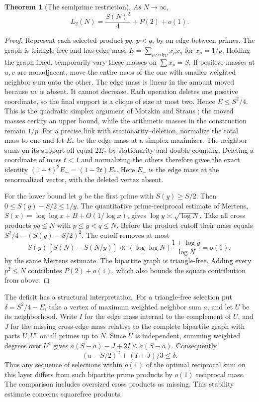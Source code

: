 \documentclass[11pt,a4paper]{article}
\newtheorem{theorem}{Theorem}[section]
\begin{document}
\begin{theorem}[The semiprime restriction]\label{thm:lcm-semiprimes}
As $N\to\infty$,
\[
 L_2(N)=\frac{S(N)^2}{4}+P(2)+o(1).
\]
\end{theorem}
\begin{proof}
Represent each selected product $pq$, $p<q$, by an edge between primes.
The graph is triangle-free and has edge mass
$E=\sum_{pq\text{ edge}}x_px_q$ for $x_p=1/p$. Holding the graph
fixed, temporarily vary these masses on $\sum x_p=S$. If positive masses
at $u,v$ are nonadjacent, move the entire mass of the one with smaller
weighted neighbor sum onto the other. The edge mass is linear in the
amount moved because $uv$ is absent. It cannot decrease. Each operation
deletes one positive coordinate, so the final support is a clique of size
at most two. Hence $E\le S^2/4$. This is the quadratic simplex argument
of Motzkin and Straus \cite{motzkin-lcm}; the moved masses certify an
upper bound, while the arithmetic masses in the construction remain $1/p$.
For a precise link with stationarity--deletion, normalize the total mass to
one and let $E_*$ be the edge mass at a simplex maximizer. The neighbor
sums on its support all equal $2E_*$ by stationarity and double counting.
Deleting a coordinate of mass $t<1$ and normalizing the others therefore
gives the exact identity $(1-t)^2E_{-}=(1-2t)E_*$. Here $E_{-}$ is
the edge mass at the renormalized vector, with the deleted vertex absent.

For the lower bound let $y$ be the first prime with $S(y)\ge S/2$.
Then $0\le S(y)-S/2\le1/y$. The quantitative prime-reciprocal
estimate of Mertens,
$S(x)=\log\log x+B+O(1/\log x)$, gives
$\log y\asymp\sqrt{\log N}$. Take all cross products $pq\le N$ with
$p\le y<q\le N$. Before the product cutoff their mass equals
$S^2/4-(S(y)-S/2)^2$. The cutoff removes at most
\[
 S(y)\,[S(N)-S(N/y)]
   \ll (\log\log N)\frac{1+\log y}{\log N}=o(1),
\]
by the same Mertens estimate. The bipartite graph is triangle-free.
Adding every $p^2\le N$ contributes $P(2)+o(1)$, which also bounds
the square contribution from above.
\end{proof}

The deficit has a structural interpretation. For a triangle-free selection
put $\delta=S^2/4-E$, take a vertex of maximum weighted neighbor sum $a$,
and let $U$ be its neighborhood. Write $I$ for the edge mass internal
to the complement of $U$, and $J$ for the missing cross-edge mass relative
to the complete bipartite graph with parts $U,U^c$ on all primes up to $N$.
Since $U$ is independent, summing weighted degrees over $U^c$ gives
$a(S-a)-J+2I\le a(S-a)$. Consequently
\[
  (a-S/2)^2+(I+J)/3\le\delta.
\]
Thus any sequence of selections within $o(1)$ of the optimal reciprocal sum
on this layer differs from such bipartite prime products by $o(1)$
reciprocal mass. The comparison includes oversized cross products as
missing. This stability estimate concerns squarefree products.
\end{document}
